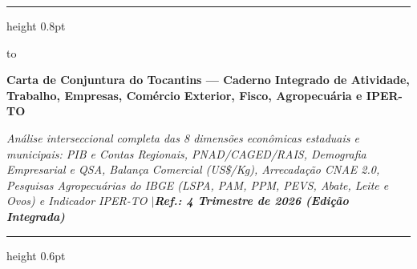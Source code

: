 \documentclass[10pt,a4paper]{article}
\begin{document}
\color{cinzatexto}

%
\par\vspace{2pt}%
{\color{coracento}\hrule height 0.8pt}%
\par\vspace{6pt}%
\noindent\hbox to %
\par\vspace{5pt}%
{\fontsize{14.5}{17.4}\selectfont\bfseries\color{corprimaria}Carta de Conjuntura do Tocantins — Caderno Integrado de Atividade, Trabalho, Empresas, Comércio Exterior, Fisco, Agropecuária e IPER-TO\par}%
\vspace{3pt}%
{\footnotesize\itshape\color{cinzasub}Análise interseccional completa das 8 dimensões econômicas estaduais e municipais: PIB e Contas Regionais, PNAD/CAGED/RAIS, Demografia Empresarial e QSA, Balança Comercial (US\$/Kg), Arrecadação CNAE 2.0, Pesquisas Agropecuárias do IBGE (LSPA, PAM, PPM, PEVS, Abate, Leite e Ovos) e Indicador IPER-TO \enspace$\vert$\enspace \textbf{\color{corprimaria}Ref.: 4\textordmasculine{} Trimestre de 2026 (Edição Integrada)}\par}%
\par\vspace{6pt}%
{\color{cinzaborda}\hrule height 0.6pt}%

\vspace{0.12cm}
\end{document}
